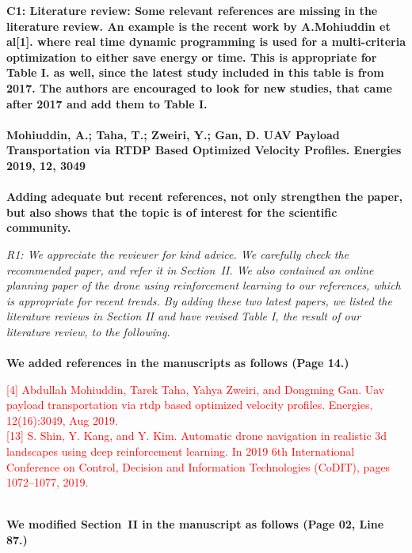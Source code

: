 \documentclass[onecolumn]{IEEEconf}
\begin{document}
\begin{description}
    \item \textbf
	{
	C1: Literature review:
    Some relevant references are missing in the literature review. An example is the recent work by A.Mohiuddin et al[1]. where real time dynamic programming is used for a multi-criteria optimization to either save energy or time. This is appropriate for Table I. as well, since the latest study included in this table is from 2017. The authors are encouraged to look for new studies, that came after 2017 and add them to Table I.~\\~\\
    Mohiuddin, A.; Taha, T.; Zweiri, Y.; Gan, D. UAV Payload Transportation via RTDP Based Optimized Velocity Profiles. Energies 2019, 12, 3049~\\~\\
    Adding adequate but recent references, not only strengthen the paper, but also shows that the topic is of interest for the scientific community.
	}
	\item \textit
	{ 
	R1: We appreciate the reviewer for kind advice. We carefully check the recommended paper, and refer it in Section~II. We also contained an online planning paper of the drone using reinforcement learning to our references, which is appropriate for recent trends.
    By adding these two latest papers, we listed the literature reviews in Section II and have revised Table I, the result of our literature review, to the following.  
	}
    ~\\
    ~\\
	\textbf{We added references in the manuscripts as follows (Page 14.)}\\
    \begin{mdframed}[ linewidth=.75pt, userdefinedwidth=0.9\textwidth]
    \textcolor{red}{[4] Abdullah Mohiuddin, Tarek Taha, Yahya Zweiri, and Dongming Gan. Uav payload transportation via rtdp  based optimized velocity profiles. Energies, 12(16):3049, Aug 2019.} \\
    \textcolor{red}{[13] S. Shin, Y. Kang, and Y. Kim. Automatic drone navigation in realistic 3d landscapes using deep reinforcement learning. 
    In 2019 6th International Conference on Control, Decision and Information Technologies (CoDIT), pages 1072–1077, 2019.}
    \end{mdframed} 
	~\\
    \textbf{We modified Section~II in the manuscript as follows (Page 02, Line 87.)}\\
    \begin{mdframed}[ linewidth=.75pt, userdefinedwidth=0.9\textwidth]

\end{mdframed}
\end{description}
\end{document}
